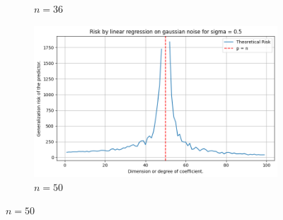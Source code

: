 \documentclass{article}
\begin{document}
\begin{figure}[htb]
\begin{subfigure}[b]{\imgwidth}
    \caption{$n=36$}\label{fig:1c}
  \end{subfigure}%
  \hfill
  \begin{subfigure}[b]{\imgwidth}
    \includegraphics[width=\linewidth]{img/descent_lin_reg_4.png}
    \caption{$n=50$}\label{fig:1d}
  \end{subfigure}

  \medskip


\end{figure}
\end{document}
